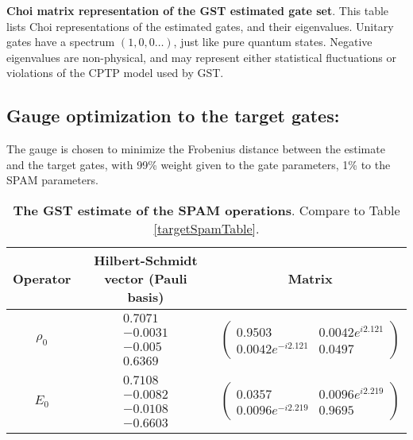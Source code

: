 {\begin{table}[h]
\begin{center}
\caption{\textbf{Choi matrix representation of the GST estimated gate set}.  This table lists Choi representations of the estimated gates, and their eigenvalues.  Unitary gates have a spectrum $(1,0,0\ldots)$, just like pure quantum states.  Negative eigenvalues are non-physical, and may represent either statistical fluctuations or violations of the CPTP model used by GST.\label{bestTargetSpamGatesetChoiTable}}
\end{center}
\end{table}

\clearpage

\subsection{Gauge optimization to the target gates:}
The gauge is chosen to minimize the Frobenius distance between the estimate and the target gates, with 99\% weight given to the gate parameters, 1\% to the SPAM parameters.


\begin{table}[h]
\begin{center}
\begin{tabular}[l]{|c|c|c|}
\hline
Operator & Hilbert-Schmidt vector (Pauli basis) & Matrix \\ \hline
$\rho_{0}$ & $ \begin{array}{c}
0.7071 \\ 
-0.0031 \\ 
-0.005 \\ 
0.6369
 \end{array} $
 & $ \left(\!\!\begin{array}{cc}
0.9503 & 0.0042e^{i2.121} \\ 
0.0042e^{-i2.121} & 0.0497
 \end{array}\!\!\right) $
 \\ \hline
$E_{0}$ & $ \begin{array}{c}
0.7108 \\ 
-0.0082 \\ 
-0.0108 \\ 
-0.6603
 \end{array} $
 & $ \left(\!\!\begin{array}{cc}
0.0357 & 0.0096e^{i2.219} \\ 
0.0096e^{-i2.219} & 0.9695
 \end{array}\!\!\right) $
 \\ \hline
\end{tabular}

\caption{\textbf{The GST estimate of the SPAM operations}.  Compare to Table \ref{targetSpamTable}.\label{bestTargetGatesGatesetSpamTable}}
\end{center}
\end{table}

}

